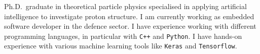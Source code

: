 

\begin{cvparagraph}

Ph.D.\ graduate in theoretical particle physics specialised in applying artificial intelligence to investigate
proton structure.
I am currently working as embedded software developer in the defence sector.
I have experience working with different programming languages, in particular with \texttt{C++} and \texttt{Python}.
I have hands-on experience with various machine learning tools like \texttt{Keras} and \texttt{Tensorflow}.
\end{cvparagraph}